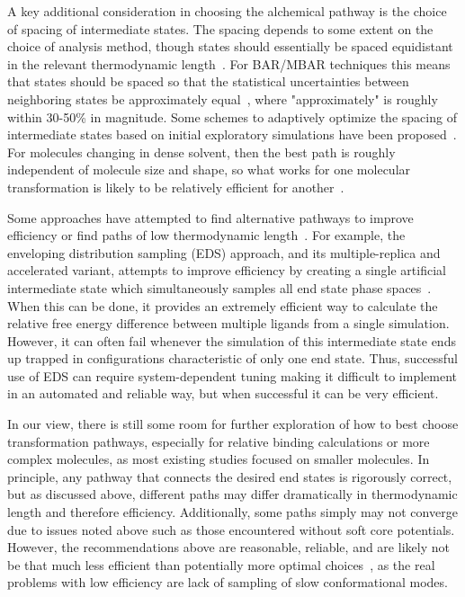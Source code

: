\documentclass[9pt,bestpractices]{livecoms}
\begin{document}
A key additional consideration in choosing the alchemical pathway is the choice of spacing of intermediate states.
The spacing depends to some extent on the choice of analysis method, though states should essentially be spaced equidistant in the relevant thermodynamic length~\cite{crooks2007measuringa, sivak2012thermodynamic}.
For BAR/MBAR techniques this means that states should be spaced so that the statistical uncertainties between neighboring states be approximately equal~\cite{pham2012optimal, shenfeld2009minimizing}, where "approximately" is roughly within 30-50\% in magnitude. 
Some schemes to adaptively optimize the spacing of intermediate states based on initial exploratory simulations have been proposed~\cite{hayes2017adaptive}. For molecules changing in dense solvent, then the best path is roughly independent of molecule size and shape, so what works for one molecular transformation is likely to be relatively efficient for another~\cite{monroe2014converging}.


Some approaches have attempted to find alternative pathways to improve efficiency or find paths of low thermodynamic length~\cite{naden2014linear,naden2015linear,pham2012optimal}. For example, the enveloping distribution sampling (EDS) approach, and its multiple-replica and accelerated variant, attempts to improve efficiency by creating a single artificial intermediate state which simultaneously samples all end state phase spaces~\cite{perthold2018accelerateda,sidler2017efficientb, christ2007envelopinga}. When this can be done, it provides an extremely efficient way to calculate the relative free energy difference between multiple ligands from a single simulation. However, it can often fail whenever the simulation of this intermediate state ends up trapped in configurations characteristic of only one end state. Thus, successful use of EDS can require system-dependent tuning making it difficult to implement in an automated and reliable way, but when successful it can be very efficient.

In our view, there is still some room for further exploration of how to best choose transformation pathways, especially for relative binding calculations or more complex molecules, as most existing studies focused on smaller molecules. In principle, any pathway that connects the desired end states is rigorously correct, but as discussed above, different paths may differ dramatically in thermodynamic length and therefore efficiency. Additionally, some paths simply may not converge due to issues noted above such as those encountered without soft core potentials. However, the recommendations above are reasonable, reliable, and are likely not be that much less efficient than potentially more optimal choices~\cite{naden2014linear,naden2015linear,pham2012optimal}, as the real problems with low efficiency are lack of sampling of slow conformational modes. 
\end{document}
